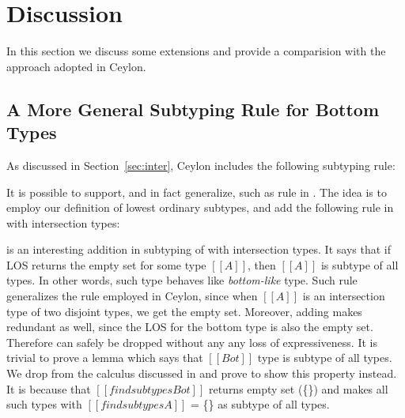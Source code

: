 \section{Discussion}
\label{sec:discussion}
In this section we discuss some extensions and provide a comparision with the approach
adopted in Ceylon. 

\subsection{A More General Subtyping Rule for Bottom  Types}
\label{sec:inter:refactoring}
As discussed in Section~\ref{sec:inter}, Ceylon includes the following subtyping rule:

\begin{center}
\end{center}

\noindent It is possible to support, and in fact generalize, such as rule in \name. The idea is to
employ our definition of lowest ordinary subtypes, and add the following rule 
in \cal with intersection types:

\begin{center}
\end{center}

\noindent {} is an interesting addition in subtyping of \cal with intersection types.
It says that if LOS returns the empty set for some type $[[A]]$, then $[[A]]$
is subtype of all types. In other words, such type behaves like \emph{bottom-like} type.
Such rule generalizes the rule employed in Ceylon, since when $[[A]]$ is an intersection type of two
disjoint types, we get the empty set.
Moreover, adding  makes  redundant as well, since the LOS for
the bottom type is also the empty set. Therefore  can safely be dropped without any
any loss of expressiveness. It is trivial to prove a lemma which says that $[[Bot]]$ type is
subtype of all types. We drop  from the calculus discussed in 
and prove  to show this property instead. It is because that $[[findsubtypes Bot]]$
returns empty set (\{\}) and  makes all such types with $[[findsubtypes A]]$ = \{\} as
subtype of all types.

